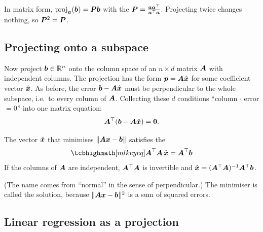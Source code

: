 In matrix form, $\operatorname{proj}_{\bm{a}}(\bm{b}) = \bm{P}\bm{b}$ with the 
$\bm{P} = \frac{\bm{a}\bm{a}^\top}{\bm{a}^\top\bm{a}}$. Projecting twice changes nothing, so
$\bm{P}^2 = \bm{P}$.

\subsection{Projecting onto a subspace}

Now project $\bm{b} \in \mathbb{R}^n$ onto the column space of an $n\times d$ matrix $\bm{A}$
with independent columns. The projection has the form $\bm{p} = \bm{A}\hat{\bm{x}}$ for some
coefficient vector $\hat{\bm{x}}$. As before, the error $\bm{b} - \bm{A}\hat{\bm{x}}$ must be
perpendicular to the whole subspace, i.e.\ to every column of $\bm{A}$. Collecting
these $d$ conditions ``column $\cdot$ error $= 0$'' into one matrix equation:
\[
  \bm{A}^\top(\bm{b} - \bm{A}\hat{\bm{x}}) = \bm{0} .
\]

\begin{theorem}\label{thm:normal-equations}
The vector $\hat{\bm{x}}$ that minimises $\lVert\bm{A}\bm{x} - \bm{b}\rVert$ satisfies the
\[
  \keyeq{\mA^\top\mA\,\hat\vx = \mA^\top\vb}
\]
If the columns of $\bm{A}$ are independent, $\bm{A}^\top\bm{A}$ is invertible and
$\hat{\bm{x}} = (\bm{A}^\top\bm{A})^{-1}\bm{A}^\top\bm{b}$.
\end{theorem}

(The name comes from ``normal'' in the sense of perpendicular.) The minimiser
is called the  solution, because $\lVert\bm{A}\bm{x} - \bm{b}\rVert^2$ is
a sum of squared errors.

\subsection{Linear regression as a projection}

